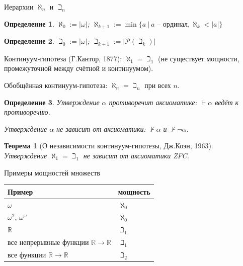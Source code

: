 \documentclass[aspectratio=169]{beamer}
\newtheorem{thm}{Теорема}[section]
\newtheorem{dfn}{Определение}[section]
\newcommand{\divisible}%
{\mathrel{\lower.2ex%
\vbox{\baselineskip=0.7ex\lineskiplimit=0pt%
\kern6pt \hbox{.}\hbox{.}\hbox{.}}%
}}
\begin{document}
\begin{frame}{Иерархии $\aleph_n$ и $\beth_n$}
\begin{dfn}$\aleph_0 := |\omega|$; $\aleph_{k+1} := \min\{ a\ |\ a\text{ -- ординал},\aleph_k < |a|\}$\end{dfn}
\begin{dfn}$\beth_0 := |\omega|$; $\beth_{k+1} := |\mathcal{P}(\beth_k)|$\end{dfn}

Континуум-гипотеза (Г.Кантор, 1877): $\aleph_1 = \beth_1$ (не существует мощности, промежуточной 
между счётной и континуумом).

Обобщённая континуум-гипотеза: $\aleph_n = \beth_n$ при всех $n$.

\begin{dfn}Утверждение $\alpha$ противоречит аксиоматике: $\vdash\alpha$ ведёт к противоречию.

Утверждение $\alpha$ не зависит от аксиоматики: $\not\vdash\alpha$ и $\not\vdash\neg\alpha$.\end{dfn}\pause

\begin{thm}[О независимости континуум-гипотезы, Дж.Коэн, 1963] Утверждение $\aleph_1 = \beth_1$
не зависит от аксиоматики ZFC.\end{thm}
\end{frame}

\begin{frame}{Примеры мощностей множеств}
\begin{center}\begin{tabular}{l|l}Пример & мощность\\\hline
$\omega$ & $\aleph_0$\\
$\omega^2$, $\omega^\omega$ & $\aleph_0$\\
$\mathbb{R}$ & $\beth_1$\\
все непрерывные функции $\mathbb{R}\rightarrow\mathbb{R}$ & $\beth_1$\\
все функции $\mathbb{R}\rightarrow\mathbb{R}$ & $\beth_2$
\end{tabular}\end{center}

\end{frame}


\end{document}
